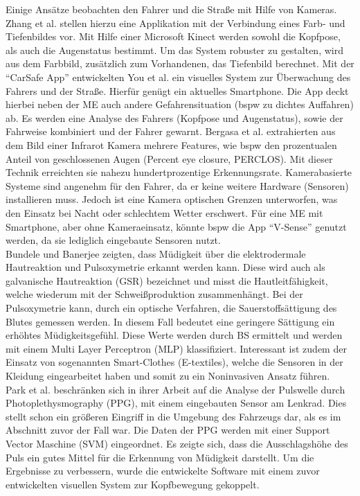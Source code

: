 {Einige Ansätze beobachten den Fahrer und die Straße mit Hilfe von Kameras. Zhang et al. \cite{Zhang:2015:RSD:2753829.2629482} stellen hierzu eine Applikation mit der Verbindung eines Farb- und Tiefenbildes vor. Mit Hilfe einer Microsoft Kinect werden sowohl die Kopfpose, als auch die Augenstatus bestimmt. Um das System robuster zu gestalten, wird aus dem Farbbild,  zusätzlich zum Vorhandenen, das Tiefenbild berechnet. Mit der "`CarSafe App"' entwickelten You et al. \cite{You:2013:CAA:2462456.2465428} ein visuelles System zur Überwachung des Fahrers und der Straße. Hierfür genügt ein aktuelles Smartphone. Die App deckt hierbei neben der \acl{ME} auch andere Gefahrensituation (\acl{bspw} zu dichtes Auffahren) ab. Es werden eine Analyse des Fahrers (Kopfpose und Augenstatus), sowie der Fahrweise kombiniert und der Fahrer gewarnt. Bergasa et al. \cite{Bergasa_1603553} extrahierten aus dem Bild einer Infrarot Kamera \cite{} mehrere Features, wie \acl{bspw} den prozentualen Anteil von geschlossenen Augen (Percent eye closure, PERCLOS). Mit dieser Technik erreichten sie nahezu hundertprozentige Erkennungsrate.
Kamerabasierte Systeme sind angenehm für den Fahrer, da er keine weitere Hardware (Sensoren) installieren muss. Jedoch ist eine Kamera optischen Grenzen unterworfen, was den Einsatz bei Nacht oder schlechtem Wetter erschwert. Für eine \acl{ME} mit Smartphone, aber ohne Kameraeinsatz, könnte \acl{bspw} die App "`V-Sense"'  \cite{Chen:2015:ISV:2742647.2742659} genutzt werden, da sie lediglich  eingebaute Sensoren nutzt.\\

Bundele und Banerjee \citep{Bundele:2009:DFV:1806338.1806478} zeigten, dass Müdigkeit über die elektrodermale Hautreaktion und Pulsoxymetrie erkannt werden kann. Diese wird auch als galvanische Hautreaktion (GSR) bezeichnet und misst die Hautleitfähigkeit, welche wiederum mit der Schweißproduktion zusammenhängt. Bei der Pulsoxymetrie kann, durch ein optische Verfahren, die Sauerstoffsättigung des Blutes gemessen werden. In diesem Fall bedeutet eine geringere Sättigung ein erhöhtes Müdigkeitsgefühl. Diese Werte werden durch \acl{BS} ermittelt und werden mit einem Multi Layer Perceptron (MLP) klassifiziert. Interessant ist zudem der Einsatz von sogenannten Smart-Clothes (E-textiles), welche die Sensoren in der Kleidung eingearbeitet haben und somit zu ein Noninvasiven Ansatz führen.\\

Park et al. \cite{Park:2009:DDD:1667780.1667798} beschränken sich in ihrer Arbeit auf die Analyse der Pulswelle durch Photoplethysmography (PPG), mit einem eingebauten Sensor am Lenkrad. Dies stellt schon ein größeren Eingriff in die Umgebung des Fahrzeugs dar, als es im Abschnitt zuvor der Fall war. Die Daten der PPG werden mit einer Support Vector Maschine (SVM) eingeordnet. Es zeigte sich, dass die Ausschlagshöhe des Puls ein gutes Mittel für die Erkennung von Müdigkeit darstellt. Um die Ergebnisse zu verbessern, wurde die entwickelte Software mit einem zuvor entwickelten visuellen System zur Kopfbewegung gekoppelt. \\

}
